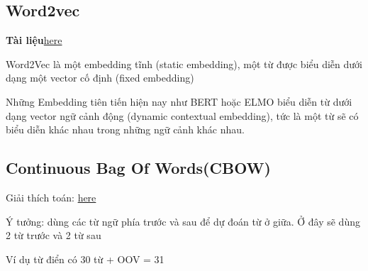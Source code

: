 \documentclass[final,letterpaper,twoside,12pt]{report}
\begin{document}
\subsection{Word2vec}

\textbf{Tài liệu}\href{https://arxiv.org/pdf/1411.2738v4}{here}

Word2Vec là một embedding tĩnh (static embedding), một từ
được biểu diễn dưới dạng một vector cố định (fixed
embedding)

Những Embedding tiên tiến hiện nay như BERT hoặc ELMO biểu
diễn từ dưới dạng vector ngữ cảnh động (dynamic contextual
embedding), tức là một từ sẽ có biểu diễn khác nhau trong
những ngữ cảnh khác nhau.



\subsection{Continuous Bag Of Words(CBOW)}

Giải thích toán: \href{https://www.youtube.com/watch?v=GMCwS7tS5ZM}{here}

Ý tưởng: dùng các từ ngữ phía trước và sau để dự đoán từ ở giữa. Ở đây sẽ dùng 2 từ trước và 2 từ sau

Ví dụ từ điển có 30 từ + OOV = 31
\end{document}
